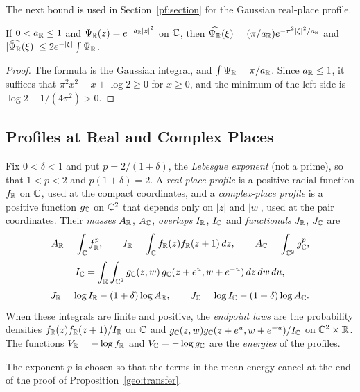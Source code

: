 The next bound is used in Section~\ref{pf:section} for the Gaussian
real-place profile.

\begin{lemma}\label{geo:gaussian}
If $0<a_\mathbb R\le1$ and $\Psi_\mathbb R(z)=e^{-a_\mathbb R|z|^2}$ on $\mathbb C$, then
$\widehat{\Psi_\mathbb R}(\xi)=(\pi/a_\mathbb R)e^{-\pi^2|\xi|^2/a_\mathbb R}$ and
$|\widehat{\Psi_\mathbb R}(\xi)|\le2e^{-|\xi|}\int\Psi_\mathbb R$.
\end{lemma}

\begin{proof}
The formula is the Gaussian integral, and $\int\Psi_\mathbb R=\pi/a_\mathbb R$. Since
$a_\mathbb R\le1$, it suffices that $\pi^2x^2-x+\log2\ge0$ for $x\ge0$, and the
minimum of the left side is $\log2-1/(4\pi^2)>0$.
\end{proof}

\subsection{Profiles at Real and Complex Places}

\begin{definition}\label{geo:profiles}
Fix $0<\delta<1$ and put $p=2/(1+\delta)$, the \emph{Lebesgue exponent}
(not a prime), so that $1<p<2$ and $p(1+\delta)=2$. A \emph{real-place
profile} is a positive radial function $f_\mathbb R$ on $\mathbb C$, used at the compact
coordinates, and a \emph{complex-place profile} is a positive function
$g_\mathbb C$ on $\mathbb C^2$ that depends only on $|z|$ and $|w|$, used at the pair
coordinates. Their \emph{masses} $A_\mathbb R$, $A_\mathbb C$, \emph{overlaps} $I_\mathbb R$,
$I_\mathbb C$ and \emph{functionals} $J_\mathbb R$, $J_\mathbb C$ are
\[
 A_\mathbb R=\int_\mathbb C f_\mathbb R^p,\qquad I_\mathbb R=\int_\mathbb C f_\mathbb R(z)f_\mathbb R(z+1)\,dz,
 \qquad A_\mathbb C=\int_{\mathbb C^2}g_\mathbb C^p,
\]
\[
 I_\mathbb C=\int_\mathbb R\int_{\mathbb C^2}g_\mathbb C(z,w)\,g_\mathbb C(z+e^u,w+e^{-u})\,dz\,dw\,du,
\]
\[
 J_\mathbb R=\log I_\mathbb R-(1+\delta)\log A_\mathbb R,\qquad
 J_\mathbb C=\log I_\mathbb C-(1+\delta)\log A_\mathbb C.
\]
When these integrals are finite and positive, the \emph{endpoint laws}
are the probability densities $f_\mathbb R(z)f_\mathbb R(z+1)/I_\mathbb R$ on $\mathbb C$ and
$g_\mathbb C(z,w)g_\mathbb C(z+e^u,w+e^{-u})/I_\mathbb C$ on $\mathbb C^2\times\mathbb R$. The functions
$V_\mathbb R=-\log f_\mathbb R$ and $V_\mathbb C=-\log g_\mathbb C$ are the \emph{energies} of the
profiles.
\end{definition}

The exponent $p$ is chosen so that the terms in the mean energy cancel at
the end of the proof of Proposition~\ref{geo:transfer}.

